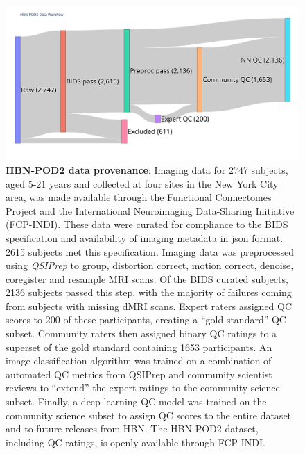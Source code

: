 \documentclass[fleqn,10pt]{wlscirep}
\begin{document}
\begin{figure}[ht]
    \centering
    \includegraphics[width=0.75\linewidth]{hbn-pod2-sankey.png}
    \caption{%
        {\bf HBN-POD2 data provenance}:
        Imaging data for \num{2747} subjects, aged 5-21 years and collected at four
        sites in the New York City area, was made available through the
        Functional Connectomes Project and the International Neuroimaging
        Data-Sharing Initiative (FCP-INDI).
        These data were curated for compliance to the BIDS specification
        \cite{gorgolewski2016-lh} and availability of imaging metadata in json
        format. \num{2615} subjects met this specification.
        Imaging data was preprocessed using \emph{QSIPrep} \cite{cieslak2021-iq}
        to group, distortion correct, motion correct, denoise, coregister and
        resample MRI scans. Of the BIDS curated subjects, \num{2136} subjects
        passed this step, with the majority of failures coming from subjects
        with missing dMRI scans.
        Expert raters assigned QC scores to \num{200} of these participants,
        creating a ``gold standard'' QC subset. Community raters then assigned
        binary QC ratings to a superset of the gold standard containing
        \num{1653} participants. An image classification algorithm was trained
        on a combination of automated QC metrics from QSIPrep and community
        scientist reviews to ``extend'' the expert ratings to the community
        science subset. Finally, a deep learning QC model was trained on the
        community science subset to assign QC scores to the entire dataset and
        to future releases from HBN.
        The HBN-POD2 dataset, including QC ratings, is openly available through
        FCP-INDI.
    }
    \label{fig:hbn-sankey}
\end{figure}
\end{document}
